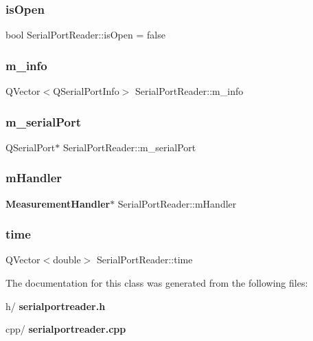 \subsubsection{is\+Open}
{\footnotesize\ttfamily bool Serial\+Port\+Reader\+::is\+Open = false\hspace{0.3cm}{\ttfamily [private]}}

\mbox{\label{class_serial_port_reader_a2c2207d575acd7adc3746e514a00e819}} 
\subsubsection{m\+\_\+info}
{\footnotesize\ttfamily Q\+Vector$<$Q\+Serial\+Port\+Info$>$ Serial\+Port\+Reader\+::m\+\_\+info\hspace{0.3cm}{\ttfamily [private]}}

\mbox{\label{class_serial_port_reader_a07a8c1715274118e7886f671f287c3ec}} 
\subsubsection{m\+\_\+serial\+Port}
{\footnotesize\ttfamily Q\+Serial\+Port$\ast$ Serial\+Port\+Reader\+::m\+\_\+serial\+Port\hspace{0.3cm}{\ttfamily [private]}}

\mbox{\label{class_serial_port_reader_a2ee8eead177a8d309115708a4ca354d0}} 
\subsubsection{m\+Handler}
{\footnotesize\ttfamily \textbf{ Measurement\+Handler}$\ast$ Serial\+Port\+Reader\+::m\+Handler\hspace{0.3cm}{\ttfamily [private]}}

\mbox{\label{class_serial_port_reader_ac023d7fa3c67e9e9d3d20e73249312c5}} 
\subsubsection{time}
{\footnotesize\ttfamily Q\+Vector$<$double$>$ Serial\+Port\+Reader\+::time\hspace{0.3cm}{\ttfamily [private]}}



The documentation for this class was generated from the following files\+:\begin{DoxyCompactItemize}
\item 
h/\textbf{ serialportreader.\+h}\item 
cpp/\textbf{ serialportreader.\+cpp}\end{DoxyCompactItemize}
